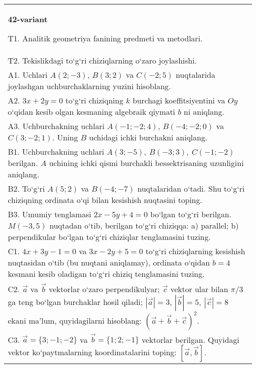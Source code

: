 \documentclass{article}
\begin{document}
\begin{tabular}{m{17cm}}
\textbf{42-variant}

T1. Analitik geometriya fanining predmeti va metodlari.
 \\
T2. 
Tekislikdagi to‘g‘ri chiziqlarning o‘zaro joylashishi.
 \\
A1. 
Uchlari $A (2;-3) $, $B (3;2) $ va $C (-2;5) $
nuqtalarida joylashgan uchburchaklarning yuzini hisoblang.
 \\
A2. 
$3x+2y=0$ to‘g‘ri chiziqning $k$ burchagi
koeffitsiyentini va $Oy$ o‘qidan kesib olgan kesmaning algebraik
qiymati $b$ ni aniqlang.
 \\
A3. 
Uchburchakning uchlari
$A (- 1; - 2;4) $, $B (- 4; - 2;0) $ va $C (3; -2;1) $. Uning $B$ uchidagi
ichki burchakni aniqlang.
 \\
B1. 
Uchburchakning uchlari
\(A (3;-5),\ B (-3;3),\ C (-1;-2) \) berilgan. $A$ uchining ichki qismi
burchakli bessektrisaning uzunligini aniqlang.
 \\
B2. 
To‘g‘ri \(A (5;2) \) va \(B (-4; -7) \) nuqtalaridan o‘tadi.
Shu to‘g‘ri chiziqning ordinata o‘qi bilan kesishish nuqtasini toping.
 \\
B3. 
Umumiy tenglamasi \(2x-5y+4=0\) bo‘lgan to‘g‘ri
berilgan. \(M (-3,5) \) nuqtadan o‘tib, berilgan to‘g‘ri chiziqqa: a) parallel;
b) perpendikular bo‘lgan to‘g‘ri chiziqlar tenglamasini tuzing.
 \\
C1. 
\(4x+3y-1=0\) va \(3x-2y+5=0\)
to‘g‘ri chiziqlarning kesishish nuqtasidan o‘tib (bu nuqtani aniqlamay), ordinata
o‘qidan \(b=4\) kesmani kesib oladigan to‘g‘ri chiziq tenglamasini tuzing.
 \\
C2. 
$\vec{a}$ va $\vec{b}$ vektorlar o‘zaro perpendikulyar; $\vec{c}$ vektor ular bilan $\pi/3$ ga teng bo‘lgan burchaklar hosil qiladi; $|\vec{a}| = 3$, $|\vec{b}| = 5,\ |\vec{c}| = 8$ ekani ma’lum, quyidagilarni hisoblang:
$ (\vec{a} + \vec{b} + \vec{c}) ^{2}$.
 \\
C3. 
$\vec{a} = \{ 3; - 1; - 2\}$ va $\vec{b} = \{ 1;2; - 1\}$ vektorlar berilgan. Quyidagi vektor ko‘paytmalarning koordinatalarini toping:
$\left\lbrack \vec{a},\vec{b} \right\rbrack$.
 \\

\end{tabular}
\vspace{1cm}
\end{document}
